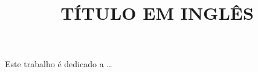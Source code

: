 \documentclass[openright]{normas-utf-tex} %
\title{\MakeUppercase{Título em Inglês}} %
\begin{document}
\capa %
\folhaderosto %


\begin{dedicatoria}
Este trabalho é dedicado a \dots 

\end{dedicatoria}

\begin{agradecimentos}


 \end{agradecimentos}


\begin{resumo}

\end{resumo}

\begin{abstract}

\end{abstract}

\listadefiguras %
\listadetabelas %
\listadesiglas %
\listadesimbolos %

\sumario %


%
%
%
%

\setcounter{page}{12}



\end{document}
